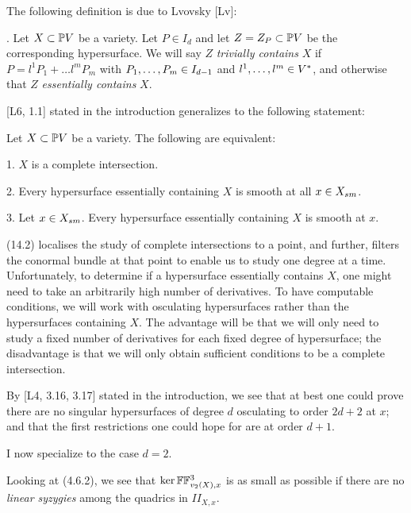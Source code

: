 \smallpagebreak

 
The following definition is due to Lvovsky [Lv]:

. Let $X\subset\Bbb P V$ be a variety. Let
$P\in I_d$ and let $Z=Z_P\subset\Bbb P V$ be the corresponding hypersurface.
We will say
$Z$ {\it trivially contains} $X$ if
$P= l^1P_1+\hdots l^mP_m$ with $P_1, \hdots , P_m\in I_{d-1}$ and $l^1, \hdots , l^m
\in V^*$, and   otherwise
that  $Z$ {\it essentially contains} $X$.

\smallpagebreak

 
[L6, 1.1] stated in the introduction generalizes to the following
statement:

  Let $X\subset\Bbb P V$
be a
variety. The following are equivalent:


1. $X$ is a complete intersection.


2. Every hypersurface
essentially containing $X$ is smooth at all $x\in X_{sm}$.

3.  Let $x\in X_{sm}$. Every
 hypersurface
essentially containing $X$ is smooth at $x$.
 \endproclaim


  



(14.2) localises the study of complete intersections to
a point, and further, filters the conormal bundle at that point
to enable us to study one degree at a time. Unfortunately, to determine
if a hypersurface essentially contains $X$, one might need to take
an arbitrarily high number of derivatives. To have computable
conditions, we will work  with osculating
hypersurfaces rather than the
hypersurfaces
 containing $X$. The advantage will be that we will only
need to study a fixed number of derivatives for each fixed degree of
hypersurface;  the disadvantage is that we will only obtain
sufficient conditions to be a complete intersection.

By [L4, 3.16, 3.17] stated in the introduction, we see that at
best one could prove there are no singular hypersurfaces of
degree $d$  osculating to order $2d+2$ at $x$; and that the first 
restrictions one could hope for are at order $d+1$.

\smallpagebreak

I now specialize to the case $d=2$.

Looking at (4.6.2), we see that
  $\text{ker}\,\Bbb F\Bbb F^{3}_{v_2(X),x}$ is as small as possible if there are no
{\it linear syzygies} among the quadrics in $II_{X,x}$.

